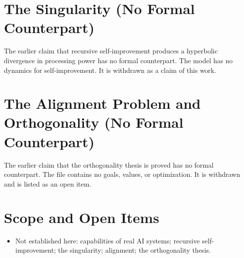 \documentclass[11pt, a4paper]{article}
\begin{document}
\section{The Singularity (No Formal Counterpart)}
The earlier claim that recursive self-improvement produces a hyperbolic divergence in processing power has no formal counterpart. The model has no dynamics for self-improvement. It is withdrawn as a claim of this work.

\section{The Alignment Problem and Orthogonality (No Formal Counterpart)}
The earlier claim that the orthogonality thesis is proved has no formal counterpart. The file contains no goals, values, or optimization. It is withdrawn and is listed as an open item.

\section{Scope and Open Items}
\begin{itemize}
  \item Not established here: capabilities of real AI systems; recursive self-improvement; the singularity; alignment; the orthogonality thesis.
\end{itemize}
\end{document}
